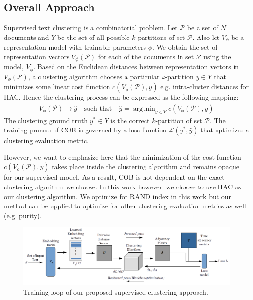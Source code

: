 \documentclass[11pt,a4paper]{article}
\DeclareMathOperator*{\argmin}{arg\,min}
\begin{document}
\subsection{Overall Approach}\label{sec:app} Supervised text clustering is a combinatorial problem. Let $\mathcal{P}$ be a set of $N$ documents and $Y$ be the set of all possible $k$-partitions of set $\mathcal{P}$. Also let $V_\phi$ be a representation model with trainable parameters $\phi$. We obtain the set of representation vectors $V_\phi(\mathcal{P})$ for each of the documents in set $\mathcal{P}$ using the model, $V_\phi$. Based on the Euclidean distances between representation vectors in $V_\phi(\mathcal{P})$, a clustering algorithm chooses a particular $k$-partition $\hat{y} \in Y$ that minimizes some linear cost function $c(V_\phi(\mathcal{P}), y)$ e.g. intra-cluster distances for HAC. Hence the clustering process can be expressed as the following mapping:
\begin{align*}
V_\phi(\mathcal{P}) \mapsto \hat{y} \quad \textrm{such that} \quad \hat{y} = \argmin_{y \in Y} c(V_\phi(\mathcal{P}), y) 
\end{align*}
The clustering ground truth $y^* \in Y$ is the correct $k$-partition of set $\mathcal{P}$. The training process of COB is governed by a loss function $\mathcal{L}(y^*,\hat{y})$ that optimizes a clustering evaluation metric. %

However, we want to emphasize here that the minimization of the cost function $c(V_\phi(\mathcal{P}), y)$ takes place inside the clustering algorithm and remains opaque for our supervised model. As a result, COB is not dependent on the exact clustering algorithm we choose. In this work however, we choose to use HAC as our clustering algorithm. We optimize for RAND index in this work but our method can be applied to optimize for other clustering evaluation metrics as well (e.g. purity).

\begin{figure}
    \centering
    \includegraphics[scale=0.58]{acl-ijcnlp2021-templates/bbcluster_arch.png}
    \caption{Training loop of our proposed supervised clustering approach.}
    \label{fig:bbc_arch}
\end{figure}
\end{document}
